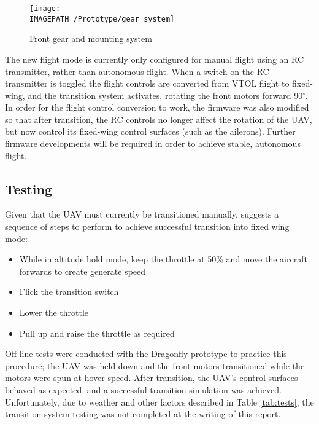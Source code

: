 \begin{figure}[!ht]
	\centering
	\texttt{[image: \\IMAGEPATH /Prototype/gear\_system]}
	\caption{Front gear and mounting system}
	\label{fig:gearsys}
\end{figure}

The new flight mode is currently only configured for manual flight using an RC transmitter, rather than autonomous flight. When a switch on the RC transmitter is toggled the flight controls are converted from VTOL flight to fixed-wing, and the transition system activates, rotating the front motors forward 90$^\circ$. In order for the flight control conversion to work, the firmware was also modified so that after transition, the RC controls no longer affect the rotation of the UAV, but now control its fixed-wing control surfaces (such as the ailerons). Further firmware developments will be required in order to achieve stable, autonomous flight.\\

\subsection{Testing}
Given that the UAV must currently be transitioned manually, \cite{ref:fireflyinstruction} suggests a sequence of steps to perform to achieve successful transition into fixed wing mode: 
\begin{itemize}
\item While in altitude hold mode, keep the throttle at 50\% and move the aircraft forwards to create generate speed
\item Flick the transition switch 
\item Lower the throttle
\item Pull up and raise the throttle as required		
\end{itemize}

Off-line tests were conducted with the Dragonfly prototype to practice this procedure; the UAV was held down and the front motors transitioned while the motors were spun at hover speed. After transition, the UAV's control surfaces behaved as expected, and a successful transition simulation was achieved. Unfortunately, due to weather and other factors described in Table \ref{tab:tests}, the transition system testing was not completed at the writing of this report.
